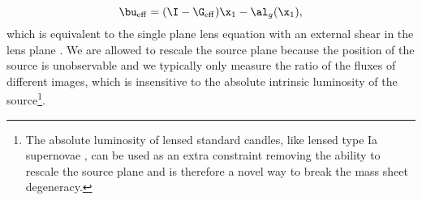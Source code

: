 \begin{equation}
\bu_{\rm eff} = (\I - \G_{\rm eff}) \x_1 - \al_g(\x_1),
\end{equation}
which is equivalent to the single plane lens equation with an external shear in the lens plane \citep[see also ][]{Schneider97}. We are allowed to rescale the source plane because the position of the source is unobservable and we typically only measure the ratio of the fluxes of different images, which is insensitive to the absolute intrinsic luminosity of the source\footnote{The absolute luminosity of lensed standard candles, like lensed type Ia supernovae \citep{Patel14, Kolatt98}, can be used as an extra constraint removing the ability to rescale the source plane and is therefore a novel way to break the mass sheet degeneracy.}.